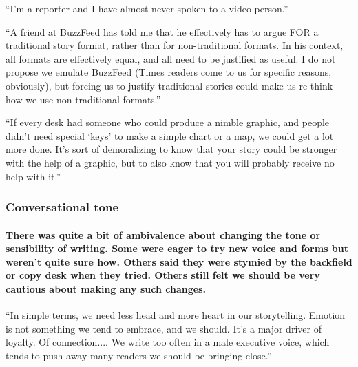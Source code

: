 ``I'm a reporter and I have almost never spoken to a video person.''

``A friend at BuzzFeed has told me that he effectively has to argue FOR
a traditional story format, rather than for non-traditional formats. In
his context, all formats are effectively equal, and all need to be
justified as useful. I do not propose we emulate BuzzFeed (Times readers
come to us for specific reasons, obviously), but forcing us to justify
traditional stories could make us re-think how we use non-traditional
formats.''

``If every desk had someone who could produce a nimble graphic, and
people didn't need special `keys' to make a simple chart or a map, we
could get a lot more done. It's sort of demoralizing to know that your
story could be stronger with the help of a graphic, but to also know
that you will probably receive no help with it.''

\hypertarget{conversational-tone}{%
\subsubsection{Conversational tone}\label{conversational-tone}}

\hypertarget{there-was-quite-a-bit-of-ambivalence-about-changing-the-tone-or-sensibility-of-writing-some-were-eager-to-try-new-voice-and-forms-but-werent-quite-sure-how-others-said-they-were-stymied-by-the-backfield-or-copy-desk-when-they-tried-others-still-felt-we-should-be-very-cautious-about-making-any-such-changes}{%
\paragraph{There was quite a bit of ambivalence about changing the tone
or sensibility of writing. Some were eager to try new voice and forms
but weren't quite sure how. Others said they were stymied by the
backfield or copy desk when they tried. Others still felt we should be
very cautious about making any such
changes.}\label{there-was-quite-a-bit-of-ambivalence-about-changing-the-tone-or-sensibility-of-writing-some-were-eager-to-try-new-voice-and-forms-but-werent-quite-sure-how-others-said-they-were-stymied-by-the-backfield-or-copy-desk-when-they-tried-others-still-felt-we-should-be-very-cautious-about-making-any-such-changes}}

``In simple terms, we need less head and more heart in our storytelling.
Emotion is not something we tend to embrace, and we should. It's a major
driver of loyalty. Of connection.... We write too often in a male
executive voice, which tends to push away many readers we should be
bringing close.''


